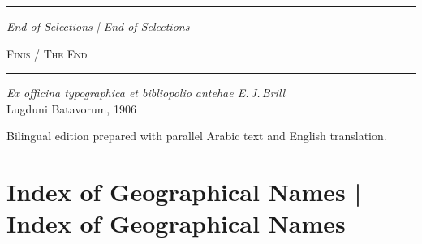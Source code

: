 \documentclass[11pt,a4paper]{article}
\newcommand{\shortline}{\noindent\rule{0.5\textwidth}{0.4pt}\par}
\begin{document}
\vspace{0.3cm}

\noindent\rule{\textwidth}{0.4pt}

\begin{center}
\textit{End of Selections | End of Selections}
\end{center}

\clearpage


\thispagestyle{empty}
\vspace*{4cm}

\begin{center}
{\large\textsc{Finis / The End}}\\[0.8cm]

\shortline\vspace{0.8cm}

{\small\textit{Ex officina typographica et bibliopolio antehae E.\,J.\,Brill}}\\[0.3cm]
{\small Lugduni Batavorum, 1906}

\vspace{1cm}

{\small Bilingual edition prepared with parallel Arabic text and English translation.}

\end{center}

\clearpage


\section*{Index of Geographical Names | Index of Geographical Names}
\end{document}
